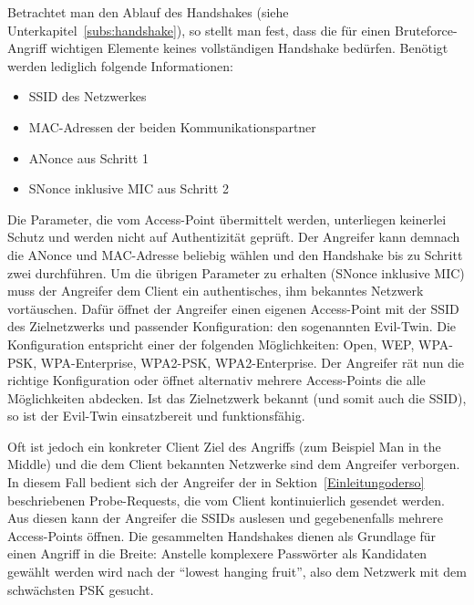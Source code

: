 Betrachtet man den Ablauf des Handshakes (siehe Unterkapitel~\ref{subs:handshake}), so stellt man fest, dass die für einen Bruteforce-Angriff wichtigen Elemente keines  vollständigen Handshake bedürfen. Benötigt werden lediglich folgende Informationen:
\begin{itemize}
	\item SSID des Netzwerkes 
	\item MAC-Adressen der beiden Kommunikationspartner
	\item ANonce aus Schritt 1
	\item SNonce inklusive MIC aus Schritt 2
\end{itemize}
Die Parameter, die vom Access-Point übermittelt werden, unterliegen keinerlei Schutz und werden nicht auf Authentizität geprüft.
Der Angreifer kann demnach die ANonce und MAC-Adresse beliebig wählen und den Handshake bis zu Schritt zwei durchführen.
Um die übrigen Parameter zu erhalten (SNonce inklusive MIC) muss der Angreifer dem Client ein authentisches, ihm bekanntes Netzwerk vortäuschen.
Dafür öffnet der Angreifer einen eigenen Access-Point mit der SSID des Zielnetzwerks und passender Konfiguration: den sogenannten Evil-Twin.
Die Konfiguration entspricht einer der folgenden Möglichkeiten: Open, WEP, WPA-PSK, WPA-Enterprise, WPA2-PSK, WPA2-Enterprise.
Der Angreifer rät nun die richtige Konfiguration oder öffnet alternativ mehrere Access-Points die alle Möglichkeiten abdecken.
Ist das Zielnetzwerk bekannt (und somit auch die SSID), so ist der Evil-Twin einsatzbereit und funktionsfähig.

Oft ist jedoch ein konkreter Client Ziel des Angriffs (zum Beispiel Man in the Middle) und die dem Client bekannten Netzwerke sind dem Angreifer verborgen.
In diesem Fall bedient sich der Angreifer der in Sektion~\ref{Einleitungoderso} beschriebenen Probe-Requests, die vom Client kontinuierlich gesendet werden.
Aus diesen kann der Angreifer die SSIDs auslesen und gegebenenfalls mehrere Access-Points öffnen.
Die gesammelten Handshakes dienen als Grundlage für einen Angriff in die Breite: Anstelle komplexere Passwörter als Kandidaten gewählt werden wird nach der \enquote{lowest hanging fruit}, also dem Netzwerk mit dem schwächsten PSK gesucht.


